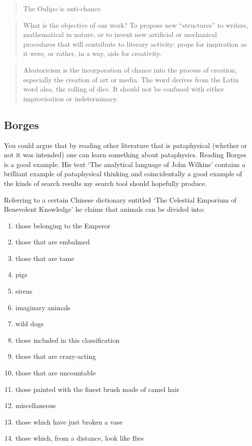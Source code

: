 \begin{quotation}
  The Oulipo is anti-chance 
\end{quotation}

\begin{quotation}
  What is the objective of our work? To propose new ``structures'' to writers, mathematical in nature, or to invent new artificial or mechanical procedures that will contribute to literary activity: props for inspiration as it were, or rather, in a way, aids for creativity. 
\end{quotation}

\begin{quotation}
  Aleatoricism is the incorporation of chance into the process of creation, especially the creation of art or media. The word derives from the Latin word alea, the rolling of dice. It should not be confused with either improvisation or indeterminacy. 
\end{quotation}


\subsection{Borges}

You could argue that by reading other literature that is pataphysical (whether or not it was intended) one can learn something about pataphysics. Reading Borges \autocite{Borges1964, Borges1999, Borges1957, Borges2010a, Borges2010b, Borges2000} is a good example. His text `The analytical language of John Wilkins' \autocite{Borges2000} contains a brilliant example of pataphysical thinking and coincidentally a good example of the kinds of search results my search tool should hopefully produce.

Referring to a certain Chinese dictionary entitled `The Celestial Emporium of Benevolent Knowledge' he claims that animals can be divided into:

\begin{enumerate}
  \item	those belonging to the Emperor
  \item	those that are embalmed
  \item	those that are tame
  \item	pigs
  \item	sirens
  \item	imaginary animals
  \item	wild dogs
  \item	those included in this classification
  \item	those that are crazy-acting
  \item	those that are uncountable
  \item	those painted with the finest brush made of camel hair
  \item	miscellaneous
  \item	those which have just broken a vase
  \item	those which, from a distance, look like flies
\end{enumerate}

